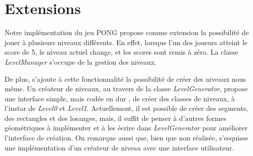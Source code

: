 \documentclass[a4paper,10pt]{article}
\theoremstyle{definition}
\begin{document}
\section{Extensions}
	Notre implémentation du jeu PONG propose comme extension la possibilité de jouer à plusieurs niveaux différents. En effet, lorsque l'un des joueurs atteint le score de 5, le niveau actuel change, et les scores sont remis à zéro. La classe \emph{LevelManager} s'occupe de la gestion des niveaux.
	
	De plus, s'ajoute à cette fonctionnalité la possibilité de créer des niveaux nous même. Un créateur de niveaux, au travers de la classe \emph{LevelGenerator}, propose une interface simple, mais \og codée en dur \fg{}, de créer des classes de niveaux, à l'instar de \emph{Level0} et \emph{Level1}. Actuellement, il est possible de créer des segments, des rectangles et des losanges, mais, il suffit de penser à d'autres formes géométriques à implémenter et à les écrire dans \emph{LevelGenerator} pour améliorer l'interface de création. On remarque aussi que, bien que non réalisée, s'esquisse une implémentation d'un créateur de niveau avec une interface utilisateur.
\end{document}

